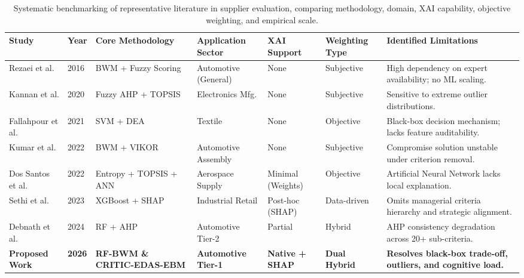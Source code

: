 \documentclass[twocolumn,10pt]{article}
\begin{document}
\begin{table}[t]
\centering
\caption{Systematic benchmarking of representative literature in supplier evaluation, comparing methodology, domain, XAI capability, objective weighting, and empirical scale.}
\label{tab:lit_comparison}
\footnotesize
\begin{tabular*}{\textwidth}{@{\extracolsep{\fill}}lllllll@{}}
\toprule
\textbf{Study} & \textbf{Year} & \textbf{Core Methodology} & \textbf{Application Sector} & \textbf{XAI Support} & \textbf{Weighting Type} & \textbf{Identified Limitations} \\
\midrule
Rezaei et al. \cite{rezaei2016supplier} & 2016 & BWM + Fuzzy Scoring & Automotive (General) & None & Subjective & High dependency on expert availability; no ML scaling. \\
Kannan et al. \cite{kannan2020sustainable} & 2020 & Fuzzy AHP + TOPSIS & Electronics Mfg. & None & Subjective & Sensitive to extreme outlier distributions. \\
Fallahpour et al. \cite{fallahpour2021hyper} & 2021 & SVM + DEA & Textile & None & Objective & Black-box decision mechanism; lacks feature auditability. \\
Kumar et al. \cite{kumar2022resilient} & 2022 & BWM + VIKOR & Automotive Assembly & None & Subjective & Compromise solution unstable under criterion removal. \\
Dos Santos et al. \cite{dos2022hybrid} & 2022 & Entropy + TOPSIS + ANN & Aerospace Supply & Minimal (Weights) & Objective & Artificial Neural Network lacks local explanation. \\
Sethi et al. \cite{sethi2023predictive} & 2023 & XGBoost + SHAP & Industrial Retail & Post-hoc (SHAP) & Data-driven & Omits managerial criteria hierarchy and strategic alignment. \\
Debnath et al. \cite{debnath2024automotive} & 2024 & RF + AHP & Automotive Tier-2 & Partial & Hybrid & AHP consistency degradation across 20+ sub-criteria. \\
\textbf{Proposed Work} & \textbf{2026} & \textbf{RF-BWM \& CRITIC-EDAS-EBM} & \textbf{Automotive Tier-1} & \textbf{Native + SHAP} & \textbf{Dual Hybrid} & \textbf{Resolves black-box trade-off, outliers, and cognitive load.} \\
\bottomrule
\end{tabular*}
\end{table}
\end{document}
